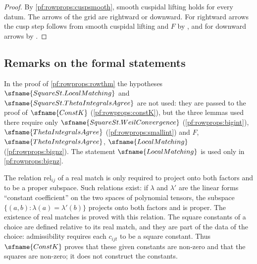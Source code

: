 \begin{proof}
By \cref{pf:rowprops:cuspsmooth}, smooth cuspidal lifting holds for every datum. The arrows of the grid are rightward or
downward. For rightward arrows the cusp step follows from smooth cuspidal lifting and $F$ by
, and for downward arrows by
.
\end{proof}

\subsection{Remarks on the formal statements}\label{sec:pf:rowprops:remarks}

\begin{remark}\label{pf:rowprops:rem:unused}
In the proof of \cref{pf:rowprops:rowthm} the hypotheses $\sfname{SquareSt.LocalMatching}$ and
$\sfname{SquareSt.ThetaIntegralsAgree}$ are not used: they are passed to the proof of $\sfname{ConstK}$
(\cref{pf:rowprops:constK}), but the three lemmas used there require only $\sfname{SquareSt.WeilConvergence}$
(\cref{pf:rowprops:bigint}), $\sfname{ThetaIntegralsAgree}$ (\cref{pf:rowprops:smallint}) and $F$,
$\sfname{ThetaIntegralsAgree}$, $\sfname{LocalMatching}$ (\cref{pf:rowprops:bignz}). The statement $\sfname{LocalMatching}$
is used only in \cref{pf:rowprops:bignz}.
\end{remark}

\begin{remark}\label{pf:rowprops:rem:rel}
The relation $\mathrm{rel}_{ij}$ of a real match is only required to project onto both factors and to be a proper
subspace. Such relations exist: if $\lambda$ and $\lambda'$ are the linear forms ``constant coefficient'' on the two
spaces of polynomial tensors, the subspace $\{(a,b):\lambda(a)=\lambda'(b)\}$ projects onto both factors and is proper.
The existence of real matches is proved with this relation. The square constants of a choice are defined relative to its
real match, and they are part of the data of the choice: admissibility requires each $c_{ijt}$ to be a square constant.
Thus $\sfname{ConstK}$ proves that these given constants are non-zero and that the squares are non-zero; it does not
construct the constants.
\end{remark}

